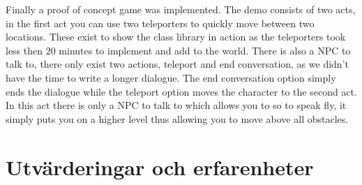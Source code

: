 \documentclass[12pt,a4paper]{article}
\begin{document}
Finally a proof of concept game was implemented. The demo consists of two acts, in the first act you can use two teleporters to quickly move between two locations. These exist to show the class library in action as the teleporters took less then 20 minutes to implement and add to the world. There is also a NPC to talk to, there only exist two actions, teleport and end conversation, as we didn't have the time to write a longer dialogue. The end conversation option simply ends the dialogue while the teleport option moves the character to the second act. In this act there is only a NPC to talk to which allows you to so to speak fly, it simply puts you on a higher level thus allowing you to move above all obstacles.



\section{Utvärderingar och erfarenheter}

\end{document}
